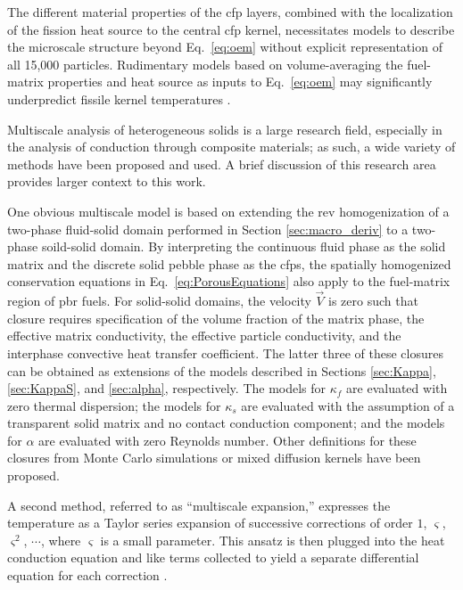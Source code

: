 The different material properties of the \gls{cfp} layers, combined with the localization of the fission heat source to the central \gls{cfp} kernel, necessitates models to describe the microscale structure beyond Eq.\ \eqref{eq:oem} without explicit representation of all 15,000 particles. Rudimentary models based on volume-averaging the fuel-matrix properties and heat source as inputs to Eq.\ \eqref{eq:oem} may significantly underpredict fissile kernel temperatures \cite{brown_fcm,kamalpour, novak_2019}.

Multiscale analysis of heterogeneous solids is a large research field, especially in the analysis of conduction through composite materials; as such, a wide variety of methods have been proposed and used. A brief discussion of this research area provides larger context to this work. 

One obvious multiscale model is based on extending the \gls{rev} homogenization of a two-phase fluid-solid domain performed in Section \ref{sec:macro_deriv} to a two-phase soild-solid domain. By interpreting the continuous fluid phase as the solid matrix and the discrete solid pebble phase as the \glspl{cfp}, the spatially homogenized conservation equations in Eq.\ \eqref{eq:PorousEquations} also apply to the fuel-matrix region of \gls{pbr} fuels. For solid-solid domains, the velocity \(\vec{V}\) is zero such that closure requires specification of the volume fraction of the matrix phase, the effective matrix conductivity, the effective particle conductivity, and the interphase convective heat transfer coefficient. The latter three of these closures can be obtained as extensions of the models described in Sections \ref{sec:Kappa}, \ref{sec:KappaS}, and \ref{sec:alpha}, respectively. The models for \(\kappa_f\) are evaluated with zero thermal dispersion; the models for \(\kappa_s\) are evaluated with the assumption of a transparent solid matrix and no contact conduction component; and the models for \(\alpha\) are evaluated with zero Reynolds number. Other definitions for these closures from Monte Carlo simulations \cite{cho} or mixed diffusion kernels \cite{espinosa} have been proposed. 

A second method, referred to as ``multiscale expansion,'' expresses the temperature as a Taylor series expansion of successive corrections of order \(1\), \(\varsigma\), \(\varsigma^2\), \(\cdots\), where \(\varsigma\) is a small parameter. This ansatz is then plugged into the heat conduction equation and like terms collected to yield a separate differential equation for each correction \cite{weinan}. 

